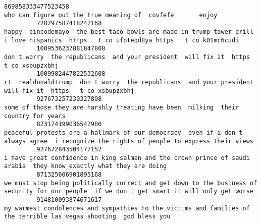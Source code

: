 \documentclass[11pt]{article}
\begin{document}
\begin{Verbatim}[commandchars=\\\{\}]
         869858333477523458                                                                                                                                                                                                                              who can figure out the true meaning of  covfefe       enjoy    
         728297587418247168                                                                                                                                                  happy  cincodemayo  the best taco bowls are made in trump tower grill  i love hispanics  https   t co ufoteqd8ya https   t co k01mc6cudi   
         1009536237881847808                                                                                                                                                                                                   don t worry  the republicans  and your president  will fix it  https   t co xsbupzxbhj   
         1009982447822532608                                                                                                                                                                              rt  realdonaldtrump  don t worry  the republicans  and your president  will fix it  https   t co xsbupzxbhj   
         927673257230327808                                                                                                                                                                                                      some of those they are harshly treating have been  milking  their country for years    
         823174199036542980                                                                                                                                                 peaceful protests are a hallmark of our democracy  even if i don t always agree  i recognize the rights of people to express their views    
         927672843504177152                                                                                                                                                                    i have great confidence in king salman and the crown prince of saudi arabia  they know exactly what they are doing       
         871325606901895168                                                                                                                                              we must stop being politically correct and get down to the business of security for our people  if we don t get smart it will only get worse   
         914810093874671617                                                                                                                                                                      my warmest condolences and sympathies to the victims and families of the terrible las vegas shooting  god bless you    

\end{Verbatim}
\end{document}
